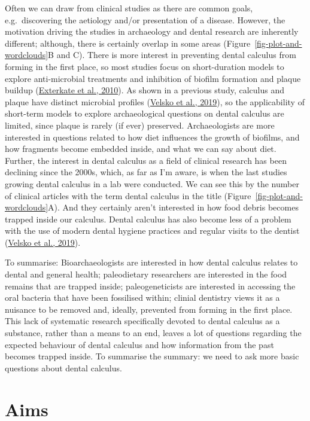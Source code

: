 \documentclass[
  letterpaper,
]{book}
\begin{document}
Often we can draw from clinical studies as there are common goals,
e.g.~discovering the aetiology and/or presentation of a disease.
However, the motivation driving the studies in archaeology and dental
research are inherently different; although, there is certainly overlap
in some areas (Figure~\ref{fig-plot-and-wordclouds}B and C). There is
more interest in preventing dental calculus from forming in the first
place, so most studies focus on short-duration models to explore
anti-microbial treatments and inhibition of biofilm formation and plaque
buildup (\protect\hyperlink{ref-extercateAAA2010}{Exterkate et al.,
2010}). As shown in a previous study, calculus and plaque have distinct
microbial profiles
(\protect\hyperlink{ref-velskoMicrobialDifferences2019}{Velsko et al.,
2019}), so the applicability of short-term models to explore
archaeological questions on dental calculus are limited, since plaque is
rarely (if ever) preserved. Archaeologists are more interested in
questions related to how diet influences the growth of biofilms, and how
fragments become embedded inside, and what we can say about diet.
Further, the interest in dental calculus as a field of clinical research
has been declining since the 2000s, which, as far as I'm aware, is when
the last studies growing dental calculus in a lab were conducted. We can
see this by the number of clinical articles with the term dental
calculus in the title (Figure~\ref{fig-plot-and-wordclouds}A). And they
certainly aren't interested in how food debris becomes trapped inside
our calculus. Dental calculus has also become less of a problem with the
use of modern dental hygiene practices and regular visits to the dentist
(\protect\hyperlink{ref-velskoMicrobialDifferences2019}{Velsko et al.,
2019}).

To summarise: Bioarchaeologists are interested in how dental calculus
relates to dental and general health; paleodietary researchers are
interested in the food remains that are trapped inside; paleogeneticists
are interested in accessing the oral bacteria that have been fossilised
within; clinial dentistry views it as a nuisance to be removed and,
ideally, prevented from forming in the first place. This lack of
systematic research specifically devoted to dental calculus as a
substance, rather than a means to an end, leaves a lot of questions
regarding the expected behaviour of dental calculus and how information
from the past becomes trapped inside. To summarise the summary: we need
to ask more basic questions about dental calculus.

\hypertarget{intro-aims}{%
\section{Aims}\label{intro-aims}}
\end{document}
